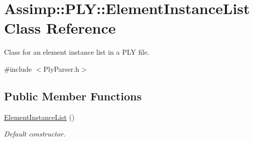 \hypertarget{class_assimp_1_1_p_l_y_1_1_element_instance_list}{\section{Assimp\+:\+:P\+L\+Y\+:\+:Element\+Instance\+List Class Reference}
\label{class_assimp_1_1_p_l_y_1_1_element_instance_list}
}


Class for an element instance list in a P\+L\+Y file.  




{\ttfamily \#include $<$Ply\+Parser.\+h$>$}

\subsection*{Public Member Functions}
\begin{DoxyCompactItemize}
\item 
\hypertarget{class_assimp_1_1_p_l_y_1_1_element_instance_list_a8dcaf45a97e4fb808423cf7bcfe244a6}{\hyperlink{class_assimp_1_1_p_l_y_1_1_element_instance_list_a8dcaf45a97e4fb808423cf7bcfe244a6}{Element\+Instance\+List} ()}\label{class_assimp_1_1_p_l_y_1_1_element_instance_list_a8dcaf45a97e4fb808423cf7bcfe244a6}

\begin{DoxyCompactList}\small\item\em Default constructor. \end{DoxyCompactList}\end{DoxyCompactItemize}
